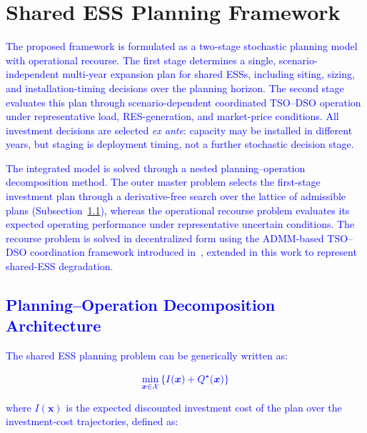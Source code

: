 \documentclass[preprint,12pt]{elsarticle}
\begin{document}
\section{Shared ESS Planning Framework}
\label{sec:methodology}

\textcolor{blue}{
    The proposed framework is formulated as a two-stage stochastic planning model with operational recourse. The first stage determines a single, scenario-independent multi-year expansion plan for shared ESSs, including siting, sizing, and installation-timing decisions over the planning horizon. The second stage evaluates this plan through scenario-dependent coordinated TSO–DSO operation under representative load, RES-generation, and market-price conditions. All investment decisions are selected \textit{ex ante}: capacity may be installed in different years, but staging is deployment timing, not a further stochastic decision stage.
}

\textcolor{blue}{
    The integrated model is solved through a nested planning–operation decomposition method. The outer master problem selects the first-stage investment plan through a derivative-free search over the lattice of admissible plans (Subsection~\ref{subsec:architecture}), whereas the operational recourse problem evaluates its expected operating performance under representative uncertain conditions. The recourse problem is solved in decentralized form using the ADMM-based TSO–DSO coordination framework introduced in~\cite{simoes_2023}, extended in this work to represent shared-ESS degradation. %
}

\subsection{\textcolor{blue}{Planning--Operation Decomposition Architecture}}
\label{subsec:architecture}

\textcolor{blue}{The shared ESS planning problem can be generically written as:}

\begin{equation}
    \textcolor{blue}{
        \min_{\boldsymbol{x}\in\mathcal{X}}
        \left\{
            I(\boldsymbol{x}) + Q^\star(\boldsymbol{x})
        \right\}
    }
    \label{eq:two_stage_planning_problem}
\end{equation}

\noindent
\textcolor{blue}{where $I(\boldsymbol{x})$ is the expected discounted investment cost of the plan over the investment-cost trajectories, defined as:}
\end{document}

